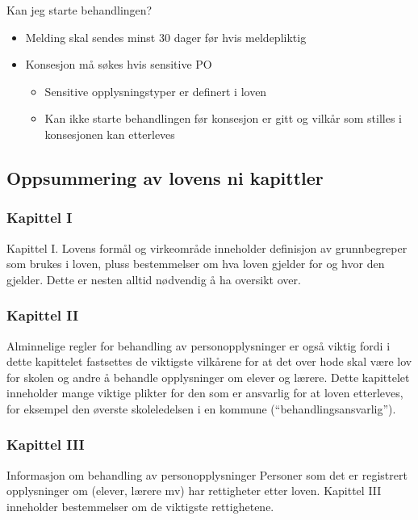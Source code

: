\documentclass[11pt]{article}
\begin{document}
    Kan jeg starte behandlingen?
\begin{itemize}
\item Melding skal sendes minst 30 dager før hvis meldepliktig
\item Konsesjon må søkes hvis sensitive PO

\begin{itemize}
\item Sensitive opplysningstyper er definert i loven
\item Kan ikke starte behandlingen før konsesjon er gitt og vilkår
        som stilles i konsesjonen kan etterleves
\end{itemize}

\end{itemize}
\subsection{Oppsummering av lovens ni kapittler}
\label{sec-17.2}
\subsubsection{Kapittel I}
\label{sec-17.2.1}

    Kapittel I. Lovens formål og virkeområde inneholder definisjon av grunnbegreper 
    som brukes i loven, pluss bestemmelser om hva loven gjelder for og hvor den gjelder. 
    Dette er nesten alltid nødvendig å ha oversikt over.
\subsubsection{Kapittel II}
\label{sec-17.2.2}

    Alminnelige regler for behandling av personopplysninger er også viktig fordi
    i dette kapittelet fastsettes de viktigste vilkårene for at det over hode
    skal være lov for skolen og andre å behandle opplysninger om elever og lærere.
    Dette kapittelet inneholder mange viktige plikter for den som er ansvarlig for
    at loven etterleves, for eksempel den øverste skoleledelsen i en kommune 
    (``behandlingsansvarlig'').
\subsubsection{Kapittel III}
\label{sec-17.2.3}

    Informasjon om behandling av personopplysninger
    Personer som det er registrert opplysninger om (elever, lærere mv) har rettigheter
    etter loven. Kapittel III inneholder bestemmelser om de viktigste rettighetene.
\end{document}
